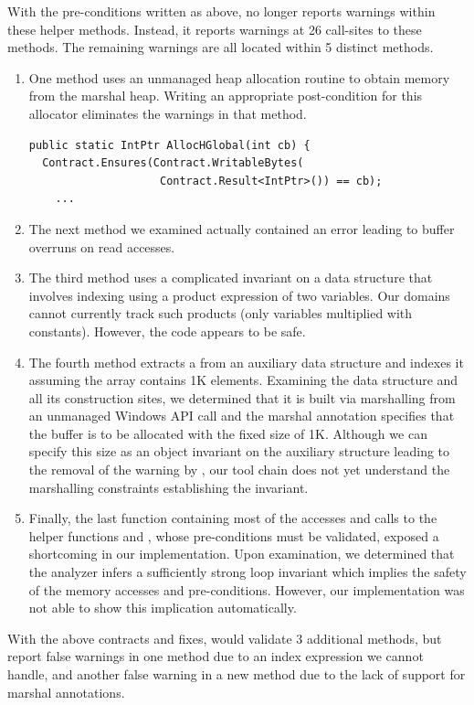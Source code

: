 \documentclass[10pt]{sigplanconf}
\begin{document}
With the pre-conditions written as above, \Clousot{} no longer reports 
warnings within these helper methods. Instead, it reports warnings at
26 call-sites to these methods. The remaining warnings are all located
within 5 distinct methods.
\begin{enumerate}
\item One method uses an unmanaged heap
allocation routine to obtain memory from the marshal heap. Writing an
appropriate post-condition for this allocator eliminates the warnings
in that method.
\begin{lstlisting}[frame=lines]
public static IntPtr AllocHGlobal(int cb) {
  Contract.Ensures(Contract.WritableBytes(
                    Contract.Result<IntPtr>()) == cb);
    ...
\end{lstlisting}

\item The next method we examined actually contained an error
  leading to buffer overruns on read accesses.

\item The third method uses a complicated invariant on a data
  structure that involves indexing using a product expression of two
  variables. Our domains cannot currently track such products (only
  variables multiplied with constants). However, the code appears to be
  safe.

\item The fourth method extracts a  from an auxiliary
  data structure and indexes it assuming the array contains 1K
  elements. Examining the data structure and all its construction
  sites, we determined that it is built via marshalling from an unmanaged
  Windows API call and the marshal annotation specifies that the buffer is
  to be allocated with the fixed size of 1K. Although we can specify this
  size as an object invariant on the auxiliary structure leading to
  the removal of the warning by \Clousot{}, our tool
  chain does not yet understand the marshalling constraints
  establishing the invariant.

\item Finally, the last function containing most of the accesses and
  calls to the helper functions  and ,
  whose pre-conditions must be validated, exposed a shortcoming in our
  implementation. Upon examination, we determined that the analyzer
  infers a sufficiently strong loop invariant which implies the safety
  of the memory accesses and
  pre-conditions. However, our implementation was not able to show
  this implication automatically. 
\end{enumerate}
With the above contracts and fixes, \Clousot{} would validate 3
additional methods, but report false warnings in one method due to an index
expression we cannot handle, and another false warning in a new method
due to the lack of support for marshal annotations.
\end{document}
